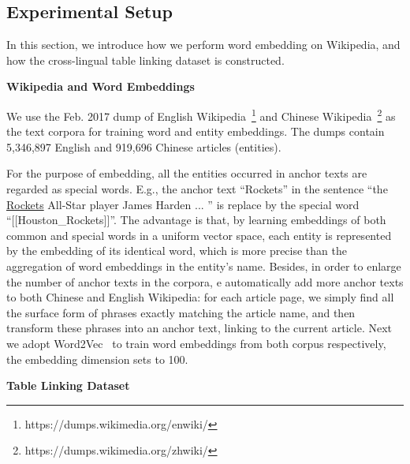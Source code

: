 \subsection{Experimental Setup}
\label{sec:exp-setup}

In this section, we introduce how we perform word embedding on Wikipedia,
and how the cross-lingual table linking dataset is constructed.

\textbf{Wikipedia and Word Embeddings}

\noindent
We use the Feb. 2017 dump of English Wikipedia~\footnote{https://dumps.wikimedia.org/enwiki/}
and Chinese Wikipedia~\footnote{https://dumps.wikimedia.org/zhwiki/}
as the text corpora for training word and entity embeddings.
The dumps contain 5,346,897 English and 919,696 Chinese articles (entities).

For the purpose of embedding, all the entities occurred in anchor texts are regarded as special words.
E.g., the anchor text ``Rockets'' in the sentence
``the \underline{Rockets} All-Star player James Harden ... ''
is replace by the special word ``[[Houston\_Rockets]]''.
The advantage is that, by learning embeddings of both common and special words
in a uniform vector space, each entity is represented by the embedding of its identical word,
which is more precise than the aggregation of word embeddings in the entity's name.
Besides, in order to enlarge the number of anchor texts in the corpora,
e automatically add more anchor texts to both Chinese and English Wikipedia:
for each article page, we simply find all the surface form of phrases exactly matching the article name,
and then transform these phrases into an anchor text, linking to the current article.
Next we adopt Word2Vec~\cite{mikolov2013distributed} to train word embeddings from both corpus respectively,
the embedding dimension sets to 100.



\noindent
\textbf{Table Linking Dataset}

